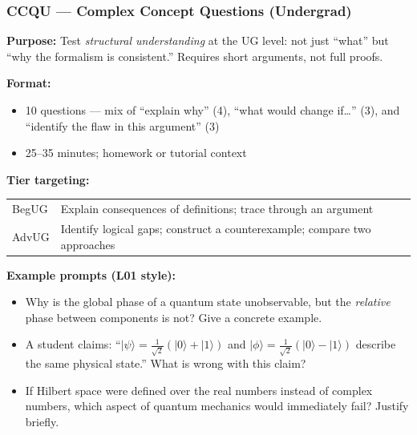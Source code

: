 \documentclass[11pt,a4paper]{article}
\begin{document}
\bigskip
\subsubsection{CCQU --- Complex Concept Questions (Undergrad)}

\begin{tcolorbox}[ugconceptbox, title={CCQU --- Complex Concept Questions, Undergraduate \hfill\normalfont 10 questions}]

\textbf{Purpose:} Test \emph{structural understanding} at the UG level: not just ``what''
but ``why the formalism is consistent.'' Requires short arguments, not full proofs.

\medskip\textbf{Format:}
\begin{itemize}[leftmargin=1.5em,itemsep=2pt]
  \item 10 questions --- mix of ``explain why'' (4), ``what would change if\ldots'' (3),
        and ``identify the flaw in this argument'' (3)
  \item 25--35 minutes; homework or tutorial context
\end{itemize}

\medskip\textbf{Tier targeting:}
\begin{center}
\begin{tabular}{lp{9cm}}
\toprule
BegUG  & Explain consequences of definitions; trace through an argument\\
AdvUG  & Identify logical gaps; construct a counterexample; compare two approaches\\
\bottomrule
\end{tabular}
\end{center}

\medskip\textbf{Example prompts (L01 style):}
\begin{itemize}[leftmargin=1.5em,itemsep=2pt]
  \item Why is the global phase of a quantum state unobservable, but the \emph{relative}
        phase between components is not? Give a concrete example.
  \item A student claims: ``$|\psi\rangle = \tfrac{1}{\sqrt{2}}(|0\rangle+|1\rangle)$
        and $|\phi\rangle = \tfrac{1}{\sqrt{2}}(|0\rangle-|1\rangle)$ describe the
        same physical state.'' What is wrong with this claim?
  \item If Hilbert space were defined over the real numbers instead of complex numbers,
        which aspect of quantum mechanics would immediately fail? Justify briefly.
\end{itemize}
\end{tcolorbox}
\end{document}
